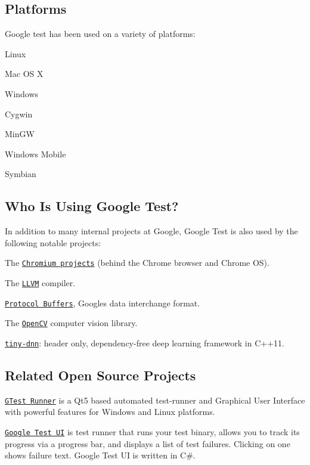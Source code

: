\subsection*{Platforms}

Google test has been used on a variety of platforms\+:


\begin{DoxyItemize}
\item Linux
\item Mac OS X
\item Windows
\item Cygwin
\item Min\+GW
\item Windows Mobile
\item Symbian
\end{DoxyItemize}

\subsection*{Who Is Using Google Test?}

In addition to many internal projects at Google, Google Test is also used by the following notable projects\+:


\begin{DoxyItemize}
\item The \href{http://www.chromium.org/}{\tt Chromium projects} (behind the Chrome browser and Chrome OS).
\item The \href{http://llvm.org/}{\tt L\+L\+VM} compiler.
\item \href{https://github.com/google/protobuf}{\tt Protocol Buffers}, Google\textquotesingle{}s data interchange format.
\item The \href{http://opencv.org/}{\tt Open\+CV} computer vision library.
\item \href{https://github.com/tiny-dnn/tiny-dnn}{\tt tiny-\/dnn}\+: header only, dependency-\/free deep learning framework in C++11.
\end{DoxyItemize}

\subsection*{Related Open Source Projects}

\href{https://github.com/nholthaus/gtest-runner}{\tt G\+Test Runner} is a Qt5 based automated test-\/runner and Graphical User Interface with powerful features for Windows and Linux platforms.

\href{https://github.com/ospector/gtest-gbar}{\tt Google Test UI} is test runner that runs your test binary, allows you to track its progress via a progress bar, and displays a list of test failures. Clicking on one shows failure text. Google Test UI is written in C\#.

